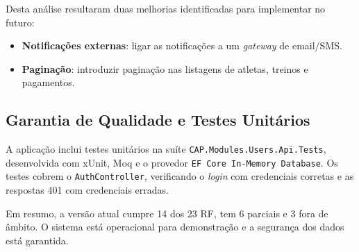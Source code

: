 Desta análise resultaram duas melhorias identificadas para implementar no futuro:

\begin{itemize}
    \item \textbf{Notificações externas}: ligar as notificações a um \textit{gateway} de email/SMS.
    \item \textbf{Paginação}: introduzir paginação nas listagens de atletas, treinos e pagamentos.
\end{itemize}

\subsection{Garantia de Qualidade e Testes Unitários}

A aplicação inclui testes unitários na suíte \texttt{CAP.Modules.Users.Api.Tests}, desenvolvida com xUnit, Moq e o provedor \texttt{EF Core In-Memory Database}. Os testes cobrem o \texttt{AuthController}, verificando o \textit{login} com credenciais corretas e as respostas 401 com credenciais erradas.

Em resumo, a versão atual cumpre 14 dos 23 RF, tem 6 parciais e 3 fora de âmbito. O sistema está operacional para demonstração e a segurança dos dados está garantida.
